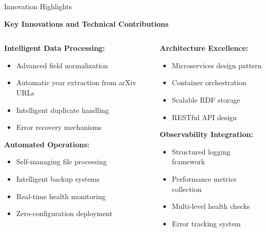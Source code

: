 \documentclass[aspectratio=169]{beamer}
\begin{document}
\begin{frame}{Innovation Highlights}
    \begin{center}
        \textbf{Key Innovations and Technical Contributions}
    \end{center}
    
    \vspace{0.5cm}
    
    \begin{columns}[c]
        \begin{column}{0.5\textwidth}
            \textbf{Intelligent Data Processing:}
            \begin{itemize}
                \item Advanced field normalization
                \item Automatic year extraction from arXiv URLs
                \item Intelligent duplicate handling
                \item Error recovery mechanisms
            \end{itemize}
            
            \vspace{0.3cm}
            
            \textbf{Automated Operations:}
            \begin{itemize}
                \item Self-managing file processing
                \item Intelligent backup systems
                \item Real-time health monitoring
                \item Zero-configuration deployment
            \end{itemize}
        \end{column}
        \begin{column}{0.5\textwidth}
            \textbf{Architecture Excellence:}
            \begin{itemize}
                \item Microservices design pattern
                \item Container orchestration
                \item Scalable RDF storage
                \item RESTful API design
            \end{itemize}
            
            \vspace{0.3cm}
            
            \textbf{Observability Integration:}
            \begin{itemize}
                \item Structured logging framework
                \item Performance metrics collection
                \item Multi-level health checks
                \item Error tracking system
            \end{itemize}
        \end{column}
    \end{columns}
\end{frame}
\end{document}

